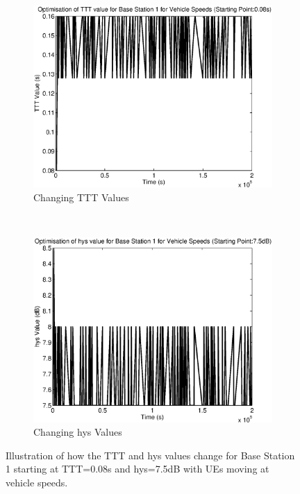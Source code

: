 \begin{figure}[H]
        \centering
        \begin{subfigure}[b]{0.49\textwidth}
                \includegraphics[width=\textwidth]{figures/graphs/vehhighhys/TTT1.eps}
                \caption{Changing TTT Values}
        \end{subfigure}%
        ~ %
        \begin{subfigure}[b]{0.49\textwidth}
                \includegraphics[width=\textwidth]{figures/graphs/vehhighhys/hys1.eps}
                \caption{Changing hys Values}
        \end{subfigure}
        \caption{Illustration of how the TTT and hys values change for Base Station 1 starting at TTT=0.08s and hys=7.5dB with UEs moving at vehicle speeds.}
\end{figure}
